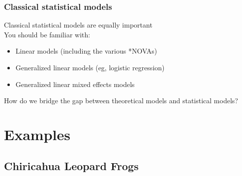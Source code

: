 \documentclass{beamer}\usepackage[]{graphicx}\usepackage[]{color}
\begin{document}
\begin{frame}
  \frametitle{Classical statistical models}
  Classical statistical models are equally important \\
  \pause
  \vfill
  You should be familiar with:
  \begin{itemize}
    \item Linear models (including the various *NOVAs)
    \item Generalized linear models (eg, logistic regression)
    \item Generalized linear mixed effects models
  \end{itemize}
\end{frame}



\begin{frame}
  \LARGE %
  \centering
  How do we bridge the gap between theoretical models and statistical 
  models?  \\
\end{frame}


\section{Examples}


\subsection{Chiricahua Leopard Frogs}
\end{document}
